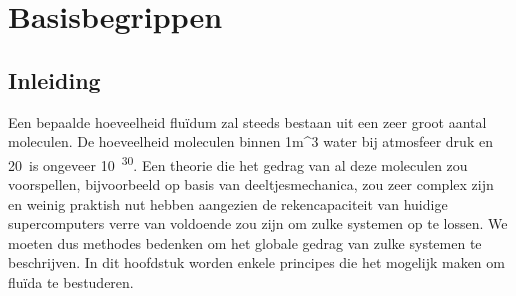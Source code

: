 \FloatBarrier
\chapter{Basisbegrippen}
\label{sec:Basisbegrippen}

	\FloatBarrier
	\section{Inleiding}
	\label{sec:Basisbegrippen Inleiding}

Een bepaalde hoeveelheid flu\"idum zal steeds bestaan uit een zeer groot aantal moleculen. De hoeveelheid moleculen binnen \unit{1}{m^3} water bij atmosfeer druk en 20\textcelsius\ is ongeveer \unit{10^{30}}{}. Een theorie die het gedrag van al deze moleculen zou voorspellen, bijvoorbeeld op basis van deeltjesmechanica, zou zeer complex zijn en weinig praktish nut hebben aangezien de rekencapaciteit van huidige supercomputers verre van voldoende zou zijn om zulke systemen op te lossen.
\npar
We moeten dus methodes bedenken om het globale gedrag van zulke systemen te beschrijven.
\npar
In dit hoofdstuk worden enkele principes die het mogelijk maken om flu\"ida te bestuderen.
	
	\FloatBarrier

